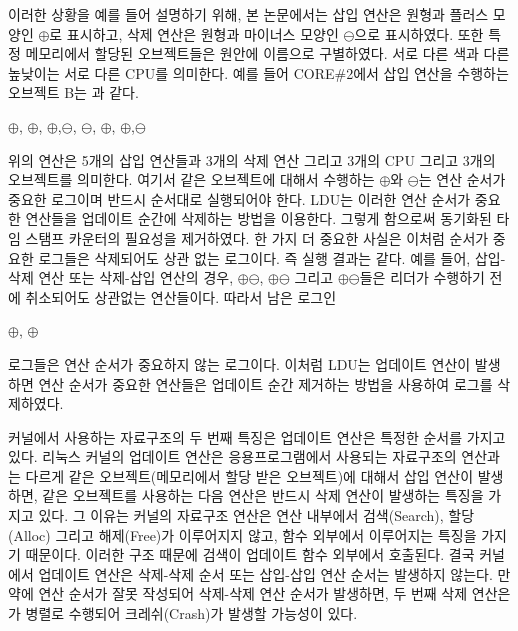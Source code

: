 이러한 상황을 예를 들어 설명하기 위해, 본 논문에서는 삽입 연산은 원형과 플러스 모양인 $\oplus$로 표시하고, 
삭제 연산은 원형과 마이너스 모양인 $\ominus$으로 표시하였다.
또한 특정 메모리에서 할당된 오브젝트들은 원안에 이름으로 구별하였다.
서로 다른 색과 다른 높낮이는 서로 다른 CPU를 의미한다. 
예를 들어 CORE\#2에서 삽입 연산을 수행하는 오브젝트 B는 과 같다.

\begin{center}
$\oplus$, $\oplus$, $\oplus$,$\ominus$,
$\ominus$, $\oplus$, $\oplus$,$\ominus$
\end{center}

위의 연산은 5개의 삽입 연산들과 3개의 삭제 연산 그리고 3개의 CPU 그리고 3개의 오브젝트를 의미한다.
여기서 같은 오브젝트에 대해서 수행하는 $\oplus$와 $\ominus$는 
연산 순서가 중요한 로그이며 반드시 순서대로 실행되어야 한다.  
LDU는 이러한 연산 순서가 중요한 연산들을 업데이트 순간에 삭제하는 방법을 이용한다.
그렇게 함으로써 동기화된 타임 스탬프 카운터의 필요성을 제거하였다. 
한 가지 더 중요한 사실은 이처럼 순서가 중요한 로그들은 삭제되어도 상관 없는 로그이다. 
즉 실행 결과는 같다.
예를 들어, 삽입-삭제 연산 또는 삭제-삽입 연산의 경우,
$\oplus$$\ominus$, $\oplus$$\ominus$ 
그리고 $\oplus$$\ominus$들은 리더가 수행하기 전에 취소되어도 상관없는 연산들이다. 
따라서 남은 로그인
\begin{center}
 $\oplus$, $\oplus$
\end{center}
로그들은 연산 순서가 중요하지 않는 로그이다.
이처럼 LDU는 업데이트 연산이 발생하면 연산 순서가 중요한 연산들은 업데이트 순간 제거하는 방법을 
사용하여 로그를 삭제하였다.

커널에서 사용하는 자료구조의 두 번째 특징은 업데이트 연산은 특정한 순서를 가지고 있다.
리눅스 커널의 업데이트 연산은 응용프로그램에서 사용되는 자료구조의 연산과는 다르게 
같은 오브젝트(메모리에서 할당 받은 오브젝트)에 대해서 삽입 연산이 발생하면, 
같은 오브젝트를 사용하는 다음 연산은 반드시 삭제 연산이 발생하는 특징을 가지고 있다.
그 이유는 커널의 자료구조 연산은 연산 내부에서 검색(Search), 할당(Alloc) 그리고 해제(Free)가 이루어지지 않고, 
함수 외부에서 이루어지는 특징을 가지기 때문이다. 
이러한 구조 때문에 검색이 업데이트 함수 외부에서 호출된다. 
결국 커널에서 업데이트 연산은 삭제-삭제 순서 또는 삽입-삽입 연산 순서는 발생하지 않는다. 
만약에 연산 순서가 잘못 작성되어 삭제-삭제 연산 순서가 발생하면, 두 번째 삭제 연산은 
가 병렬로 수행되어 크레쉬(Crash)가 발생할 가능성이 있다. 

